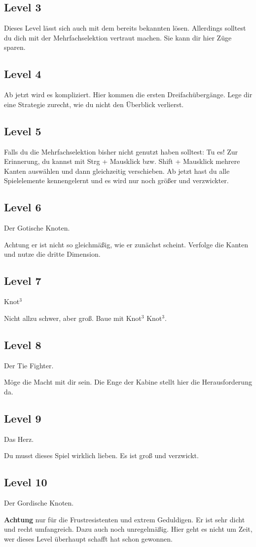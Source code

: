 \documentclass{scrartcl}
\begin{document}
\subsection*{Level 3}
Dieses Level lässt sich auch mit dem bereits bekannten lösen. Allerdings solltest du dich mit der Mehrfachselektion vertraut machen. Sie kann dir hier Züge sparen.

\subsection*{Level 4}
Ab jetzt wird es kompliziert. Hier kommen die ersten Dreifachübergänge. Lege dir eine Strategie zurecht, wie du nicht den Überblick verlierst.

\subsection*{Level 5}
Falls du die Mehrfachselektion bisher nicht genutzt haben solltest: Tu es!
Zur Erinnerung, du kannst mit Strg + Mausklick bzw. Shift + Mausklick mehrere Kanten auswählen und dann gleichzeitig verschieben.
Ab jetzt hast du alle Spielelemente kennengelernt und es wird nur noch größer und verzwickter.

\subsection*{Level 6}
Der Gotische Knoten.

Achtung er ist nicht so gleichmäßig, wie er zunächst scheint. Verfolge die Kanten und nutze die dritte Dimension.

\subsection*{Level 7}
Knot$^3$

Nicht allzu schwer, aber groß. Baue mit Knot$^3$ Knot$^3$.

\subsection*{Level 8}
Der Tie Fighter.

Möge die Macht mit dir sein. Die Enge der Kabine stellt hier die Herausforderung da.

\subsection*{Level 9}
Das Herz.

Du musst dieses Spiel wirklich lieben. Es ist groß und verzwickt.

\subsection*{Level 10}
Der Gordische Knoten.

{\bf Achtung} nur für die Frustresistenten und extrem Geduldigen. Er ist sehr dicht und recht umfangreich. Dazu auch noch unregelmäßig. Hier geht es nicht um Zeit, wer dieses Level überhaupt schafft hat schon gewonnen.
\end{document}
